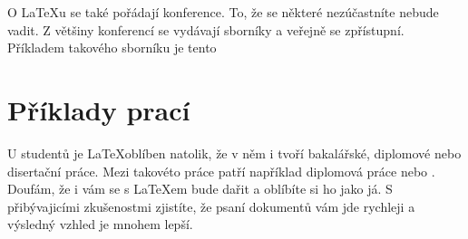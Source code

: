 \documentclass[11pt,titlepage,a4paper]{article}
\begin{document}
O \LaTeX u se také pořádají konference. To, že se některé nezúčastníte nebude vadit. Z většiny konferencí se vydávají sborníky a veřejně se zpřístupní. Příkladem takového sborníku je tento \cite{sbornik}


\section{Příklady prací}

U studentů je \LaTeX oblíben natolik, že v něm i tvoří bakalářské, diplomové nebo disertační práce. Mezi takovéto práce patří například diplomová práce \cite{diplomka1} nebo \cite{diplomka2}. Doufám, že i vám se s \LaTeX em bude dařit a oblíbíte si ho jako já. S přibývajicími zkušenostmi zjistíte, že psaní dokumentů vám jde rychleji a výsledný vzhled je mnohem lepší.


\newpage

\end{document}
